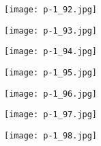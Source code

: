 \clearpage


\begin{figure}
    \begin{center}
        \texttt{[image: p-1\_92.jpg]}
        \caption{}
    \end{center}
\end{figure}

\clearpage


\begin{figure}
    \begin{center}
        \texttt{[image: p-1\_93.jpg]}
        \caption{}
    \end{center}
\end{figure}

\clearpage


\begin{figure}
    \begin{center}
        \texttt{[image: p-1\_94.jpg]}
        \caption{}
    \end{center}
\end{figure}

\clearpage


\begin{figure}
    \begin{center}
        \texttt{[image: p-1\_95.jpg]}
        \caption{}
    \end{center}
\end{figure}

\clearpage


\begin{figure}
    \begin{center}
        \texttt{[image: p-1\_96.jpg]}
        \caption{}
    \end{center}
\end{figure}

\clearpage


\begin{figure}
    \begin{center}
        \texttt{[image: p-1\_97.jpg]}
        \caption{}
    \end{center}
\end{figure}

\clearpage


\begin{figure}
    \begin{center}
        \texttt{[image: p-1\_98.jpg]}
        \caption{}
    \end{center}
\end{figure}

